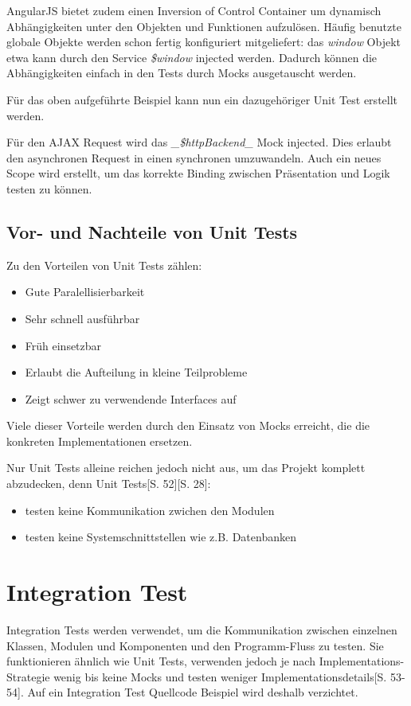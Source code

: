 \documentclass[a4paper,bibtotoc,oneside]{scrbook}
\begin{document}
AngularJS bietet zudem einen Inversion of Control Container um dynamisch Abhängigkeiten unter den Objekten und Funktionen aufzulösen. Häufig benutzte globale Objekte werden schon fertig konfiguriert mitgeliefert: das \emph{window} Objekt etwa kann durch den Service \emph{\$window} injected werden. Dadurch können die Abhängigkeiten einfach in den Tests durch Mocks ausgetauscht werden.

Für das oben aufgeführte Beispiel kann nun ein dazugehöriger Unit Test erstellt werden.

Für den AJAX Request wird das \emph{\_\$httpBackend\_} Mock injected. Dies erlaubt den asynchronen Request in einen synchronen umzuwandeln. Auch ein neues Scope wird erstellt, um das korrekte Binding zwischen Präsentation und Logik testen zu können.



\section{Vor- und Nachteile von Unit Tests}

Zu den Vorteilen von Unit Tests zählen:

\begin{itemize}
  \item Gute Paralellisierbarkeit
  \item Sehr schnell ausführbar
  \item Früh einsetzbar
  \item Erlaubt die Aufteilung in kleine Teilprobleme
  \item Zeigt schwer zu verwendende Interfaces auf
\end{itemize}

Viele dieser Vorteile werden durch den Einsatz von Mocks erreicht, die die konkreten Implementationen ersetzen.

Nur Unit Tests alleine reichen jedoch nicht aus, um das Projekt komplett abzudecken, denn Unit Tests\cite{test_large_systems}[S. 52]\cite{betrieb}[S. 28]:

\begin{itemize}
  \item testen keine Kommunikation zwichen den Modulen
  \item testen keine Systemschnittstellen wie z.B. Datenbanken
\end{itemize}

\chapter{Integration Test}
Integration Tests werden verwendet, um die Kommunikation zwischen einzelnen Klassen, Modulen und Komponenten und den Programm-Fluss zu testen. Sie funktionieren ähnlich wie Unit Tests, verwenden jedoch je nach Implementations-Strategie wenig bis keine Mocks und testen weniger Implementationsdetails\cite{test_large_systems}[S. 53-54]. Auf ein Integration Test Quellcode Beispiel wird deshalb verzichtet. 
\end{document}
